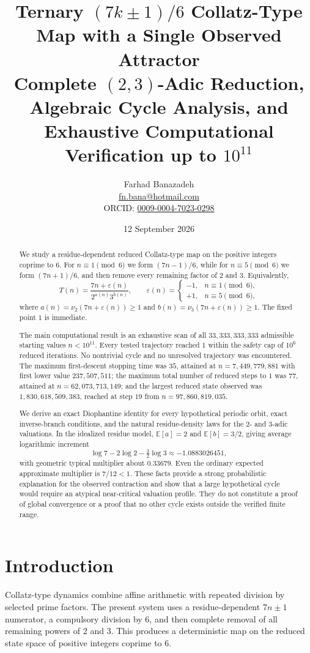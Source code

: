 \documentclass[11pt]{article}
\title{\textbf{Ternary $(7k\pm1)/6$ Collatz-Type Map with a Single Observed Attractor}\\[2mm]
\large Complete $(2,3)$-Adic Reduction, Algebraic Cycle Analysis, and Exhaustive Computational Verification up to $10^{11}$}
\author{Farhad Banazadeh\\\href{mailto:fn.bana@hotmail.com}{fn.bana@hotmail.com}\\ORCID: \href{https://orcid.org/0009-0004-7023-0298}{0009-0004-7023-0298}}
\date{12 September 2026}
\begin{document}
\maketitle

\begin{abstract}
We study a residue-dependent reduced Collatz-type map on the positive integers coprime to $6$. For $n\equiv1\pmod 6$ we form $(7n-1)/6$, while for $n\equiv5\pmod6$ we form $(7n+1)/6$, and then remove every remaining factor of $2$ and $3$. Equivalently,
\[
T(n)=\frac{7n+\varepsilon(n)}{2^{a(n)}3^{b(n)}},\qquad
\varepsilon(n)=\begin{cases}-1,&n\equiv1\pmod6,\\+1,&n\equiv5\pmod6,\end{cases}
\]
where $a(n)=\nu_2(7n+\varepsilon(n))\ge1$ and $b(n)=\nu_3(7n+\varepsilon(n))\ge1$. The fixed point $1$ is immediate.

The main computational result is an exhaustive scan of all $33,333,333,333$ admissible starting values $n<10^{11}$. Every tested trajectory reached $1$ within the safety cap of $10^6$ reduced iterations. No nontrivial cycle and no unresolved trajectory was encountered. The maximum first-descent stopping time was $35$, attained at $n=7,449,779,881$ with first lower value $237,507,511$; the maximum total number of reduced steps to $1$ was $77$, attained at $n=62,073,713,149$; and the largest reduced state observed was $1,830,618,509,383$, reached at step $19$ from $n=97,860,819,035$.

We derive an exact Diophantine identity for every hypothetical periodic orbit, exact inverse-branch conditions, and the natural residue-density laws for the $2$- and $3$-adic valuations. In the idealized residue model, $\mathbb E[a]=2$ and $\mathbb E[b]=3/2$, giving average logarithmic increment
\[
\log 7-2\log2-\tfrac32\log3\approx-1.0883026451,
\]
with geometric typical multiplier about $0.33679$. Even the ordinary expected approximate multiplier is $7/12<1$. These facts provide a strong probabilistic explanation for the observed contraction and show that a large hypothetical cycle would require an atypical near-critical valuation profile. They do not constitute a proof of global convergence or a proof that no other cycle exists outside the verified finite range.
\end{abstract}

\section{Introduction}
Collatz-type dynamics combine affine arithmetic with repeated division by selected prime factors. The present system uses a residue-dependent $7n\pm1$ numerator, a compulsory division by $6$, and then complete removal of all remaining powers of $2$ and $3$. This produces a deterministic map on the reduced state space of positive integers coprime to $6$.
\end{document}
